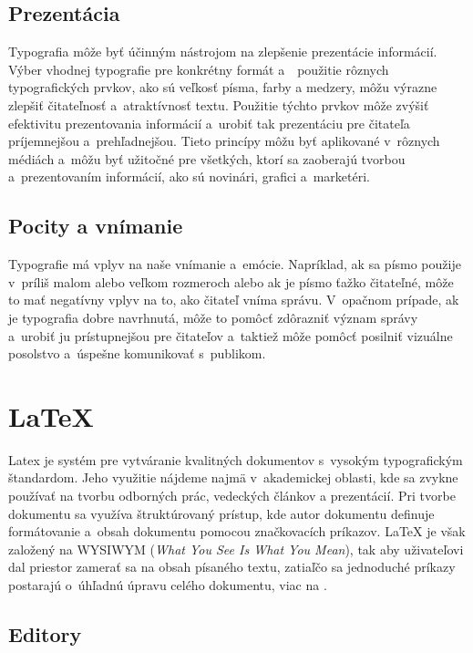 \documentclass[a4paper, 11pt]{article}
\begin{document}
\subsection{Prezentácia}
Typografia môže byť účinným nástrojom na zlepšenie prezentácie informácií. Výber vhodnej typografie pre konkrétny formát a~~použitie rôznych typografických prvkov, ako sú veľkosť písma, farby a medzery, môžu výrazne zlepšiť čitateľnosť a~atraktívnosť textu. Použitie týchto prvkov môže zvýšiť efektivitu prezentovania informácií a~urobiť tak prezentáciu pre čitateľa príjemnejšou a~prehľadnejšou. Tieto princípy môžu byť aplikované v~rôznych médiách a~môžu byť užitočné pre všetkých, ktorí sa zaoberajú tvorbou a~prezentovaním informácií, ako sú novinári, grafici a~marketéri. \cite{NovotnaMaria2019}

\subsection{Pocity a vnímanie}
Typografie má vplyv na naše vnímanie a~emócie. Napríklad, ak sa písmo použije v~príliš malom alebo veľkom rozmeroch alebo ak je písmo ťažko čitateľné, môže to mať negatívny vplyv na to, ako čitateľ vníma správu. V~opačnom prípade, ak je typografia dobre navrhnutá, môže to pomôcť zdôrazniť význam správy a~urobiť ju prístupnejšou pre čitateľov a~taktiež môže pomôcť posilniť vizuálne posolstvo a~úspešne komunikovať s~publikom. \cite{LUPTON}

\section{\LaTeX}
Latex je systém pre vytváranie kvalitných dokumentov s~vysokým typografickým štandardom. Jeho využitie nájdeme najmä v~akademickej oblasti, kde sa zvykne používať na tvorbu odborných prác, vedeckých článkov a prezentácií. Pri tvorbe dokumentu sa využíva štruktúrovaný prístup, kde autor dokumentu definuje formátovanie a~obsah dokumentu pomocou značkovacích príkazov. \LaTeX{} je však založený na WYSIWYM (\emph{What You See Is What You Mean}), tak aby uživateľovi dal priestor zamerať sa na obsah písaného textu, zatiaľčo sa jednoduché príkazy postarajú o~úhľadnú úpravu celého dokumentu, viac na \cite{Overleaf}.

\subsection{Editory}
\end{document}
